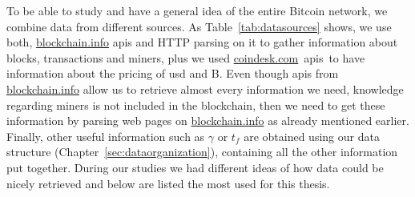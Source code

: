 \documentclass[USenglish]{uit-thesis}
\def\bitcoin{\leavevmode\rlap{\hskip.5pt-}B}
\begin{document}
To be able to study and have a general idea of the entire Bitcoin
network, we combine data from different sources. As Table~\ref{tab:datasources}
shows, we use both, \url{blockchain.info} \gls{api}s and HTTP parsing
on it to gather information about blocks, transactions and miners,
plus we used \url{coindesk.com}~\gls{api}s\,\cite{coindesk, forex-python}
to have information about the pricing of \gls{usd} and \bitcoin.
Even though \gls{api}s from \url{blockchain.info} allow us to
retrieve almost every information we need,
knowledge regarding miners is
not included in the blockchain, then we
need to get these information by parsing
web pages on \url{blockchain.info} as already mentioned
earlier. Finally, other useful information such as
$\gamma$ or $t_f$ are obtained using our
data structure (Chapter~\ref{sec:dataorganization}),
containing all the other information put together.
During our studies we had different ideas of
how data could be nicely retrieved and below are
listed the most used for this thesis.
\end{document}
